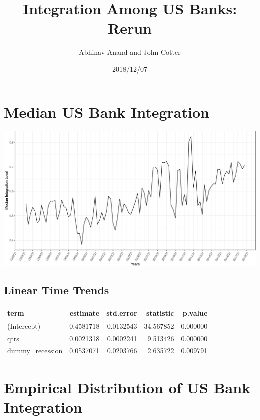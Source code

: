 \documentclass[11pt,]{article}
\title{Integration Among US Banks: Rerun}
\author{Abhinav Anand and John Cotter}
\date{2018/12/07}
\begin{document}
\maketitle

\section{Median US Bank Integration}\label{median-us-bank-integration}

\begin{center}\includegraphics{AC_US_Bank_Int_Results_1_files/figure-latex/med_US_bank_int-1} \end{center}

\subsection{Linear Time Trends}\label{linear-time-trends}

\begin{longtable}[]{@{}lrrrr@{}}
\toprule
term & estimate & std.error & statistic & p.value\tabularnewline
\midrule
\endhead
(Intercept) & 0.4581718 & 0.0132543 & 34.567852 &
0.000000\tabularnewline
qtrs & 0.0021318 & 0.0002241 & 9.513426 & 0.000000\tabularnewline
dummy\_recession & 0.0537071 & 0.0203766 & 2.635722 &
0.009791\tabularnewline
\bottomrule
\end{longtable}

\section{Empirical Distribution of US Bank
Integration}\label{empirical-distribution-of-us-bank-integration}
\end{document}
